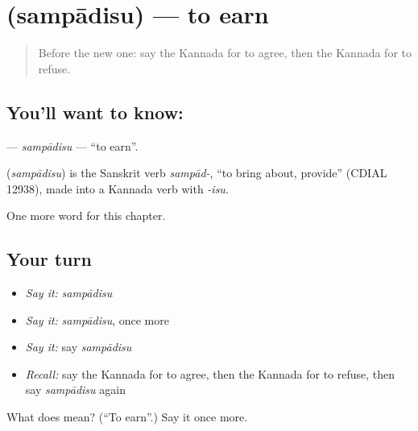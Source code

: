 \section[\texorpdfstring{\kn{ಸಂಪಾದಿಸು} (sampādisu)}{ಸಂಪಾದಿಸು (sampādisu)}]{ (sampādisu) — to earn}

\label{lesson:KA-C238-sampadisu}



\begin{quote}
Before the new one: say the Kannada for to agree, then the Kannada for to refuse.
\end{quote}

\subsection*{You'll want to know: }
\textbf{} — \emph{sampādisu} — \textquotedblleft{}to earn\textquotedblright{}.

\begin{cousinweb}
\textbf{} (\emph{sampādisu}) is the Sanskrit verb \emph{sampād-}, \textquotedblleft{}to bring about, provide\textquotedblright{} (CDIAL 12938), made into a Kannada verb with \emph{-isu}.
\end{cousinweb}

\begin{grammarlens}[title={What you've built}]
One more word for this chapter.
\end{grammarlens}

\subsection*{Your turn}
\begin{itemize}
\raggedright
  \item \emph{Say it:} \emph{sampādisu}
  \item \emph{Say it:} \emph{sampādisu}, once more
  \item \emph{Say it:} say \emph{sampādisu}
  \item \emph{Recall:} say the Kannada for to agree, then the Kannada for to refuse, then say \emph{sampādisu} again
\end{itemize}

\begin{tcolorbox}[breakable,colback=teal!4,colframe=teal!35!black,title={Before you move on}]
What does  mean? (\textquotedblleft{}To earn\textquotedblright{}.) Say it once more.
\end{tcolorbox}
